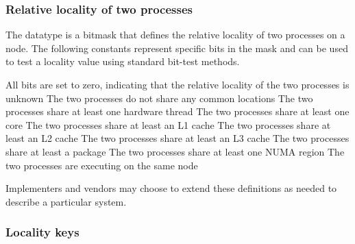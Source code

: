 \begin{arglist}
\end{arglist}


\subsubsection{Relative locality of two processes}
\label{api:proc:locality}

The  datatype is a  bitmask that
defines the relative locality of two processes on a node. The following
constants represent specific bits in the mask and can be used to test a
locality value using standard bit-test methods.

\begin{constantdesc}
%
All bits are set to zero, indicating that the relative locality of the two processes is unknown
%
The two processes do not share any common locations
%
The two processes share at least one hardware thread
%
The two processes share at least one core
%
The two processes share at least an L1 cache
%
The two processes share at least an L2 cache
%
The two processes share at least an L3 cache
%
The two processes share at least a package
%
The two processes share at least one \ac{NUMA} region
%
The two processes are executing on the same node
%
\end{constantdesc}


Implementers and vendors may choose to extend these definitions as needed to describe a particular system.


\subsubsection{Locality keys}

